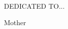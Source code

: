 
\hspace{0pt}
\vfill
\begin{center}
  \vspace*{2em}
  \large
  \uppercase{Dedicated to...}
\end{center}

\normalsize

\begin{center}
  \huge
  Mother
\end{center}
\vfill
\hspace{0pt}
